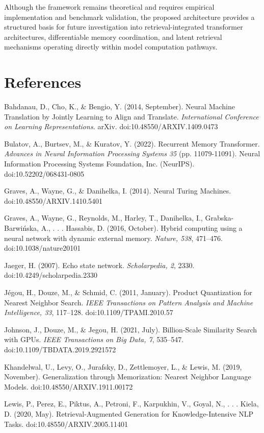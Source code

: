 \documentclass[
]{article}
\begin{document}
Although the framework remains theoretical and requires empirical
implementation and benchmark validation, the proposed architecture
provides a structured basis for future investigation into
retrieval-integrated transformer architectures, differentiable memory
coordination, and latent retrieval mechanisms operating directly within
model computation pathways.

\hypertarget{references}{%
\section{References}\label{references}}

Bahdanau, D., Cho, K., \& Bengio, Y. (2014, September). Neural Machine
Translation by Jointly Learning to Align and Translate.
\emph{International Conference on Learning Representations.} arXiv.
doi:10.48550/ARXIV.1409.0473

Bulatov, A., Burtsev, M., \& Kuratov, Y. (2022). Recurrent Memory
Transformer. \emph{Advances in Neural Information Processing Systems 35}
(pp. 11079-11091). Neural Information Processing Systems Foundation,
Inc. (NeurIPS). doi:10.52202/068431-0805

Graves, A., Wayne, G., \& Danihelka, I. (2014). Neural Turing Machines.
doi:10.48550/ARXIV.1410.5401

Graves, A., Wayne, G., Reynolds, M., Harley, T., Danihelka, I.,
Grabska-Barwińska, A., . . . Hassabis, D. (2016, October). Hybrid
computing using a neural network with dynamic external memory.
\emph{Nature, 538}, 471--476. doi:10.1038/nature20101

Jaeger, H. (2007). Echo state network. \emph{Scholarpedia, 2}, 2330.
doi:10.4249/scholarpedia.2330

Jégou, H., Douze, M., \& Schmid, C. (2011, January). Product
Quantization for Nearest Neighbor Search. \emph{IEEE Transactions on
Pattern Analysis and Machine Intelligence, 33}, 117--128.
doi:10.1109/TPAMI.2010.57

Johnson, J., Douze, M., \& Jegou, H. (2021, July). Billion-Scale
Similarity Search with GPUs. \emph{IEEE Transactions on Big Data, 7},
535--547. doi:10.1109/TBDATA.2019.2921572

Khandelwal, U., Levy, O., Jurafsky, D., Zettlemoyer, L., \& Lewis, M.
(2019, November). Generalization through Memorization: Nearest Neighbor
Language Models. doi:10.48550/ARXIV.1911.00172

Lewis, P., Perez, E., Piktus, A., Petroni, F., Karpukhin, V., Goyal, N.,
. . . Kiela, D. (2020, May). Retrieval-Augmented Generation for
Knowledge-Intensive NLP Tasks. doi:10.48550/ARXIV.2005.11401
\end{document}
